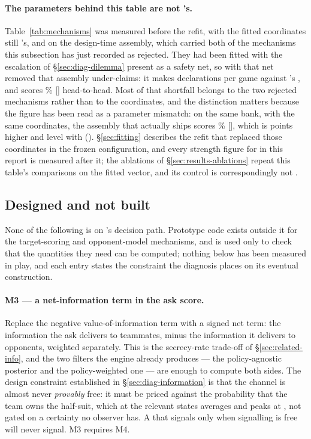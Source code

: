 \paragraph{The parameters behind this table are not \vfive{}'s.}
Table~\ref{tab:mechanisms} was measured before the refit, with the
\numFitDims{} fitted coordinates still \vfour{}'s, and on the design-time
assembly, which carried both of the mechanisms this subsection has just recorded
as rejected. They had been fitted with the escalation of
\S\ref{sec:diag-dilemma} present as a safety net, so with that net removed that
assembly under-claims: it makes \numVfourParamDecl{}
declarations per game against \vfour{}'s \numVfourDecl{}, and scores
\numVfourParamWin\% [\numVfourParamCI] head-to-head. Most of that shortfall
belongs to the two rejected mechanisms rather than to the coordinates, and the
distinction matters because the figure has been read as a parameter mismatch:
on the same bank, with the same \vfour{} coordinates, the assembly that actually
ships scores \numShipParamSameBank\% [\numShipParamSameCI], which is
\numRejectedCost{} points higher and level with \vfour{}
().
\S\ref{sec:fitting} describes the refit that replaced those
coordinates in the frozen configuration, and every strength figure for \vfive{}
in this report is measured after it; the ablations of
\S\ref{sec:results-ablations} repeat this table's comparisons on the fitted
vector, and its control is correspondingly not \vfour{}.

\subsection{Designed and not built}
\label{sec:mech-designed}

None of the following is on \vfive{}'s decision path. Prototype code exists
outside it for the target-scoring and opponent-model mechanisms, and is used only
to check that the quantities they need can be computed; nothing below has been
measured in play, and each entry states the constraint the diagnosis places on
its eventual construction.

\paragraph{M3 --- a net-information term in the ask score.} Replace the negative
value-of-information term with a signed net term: the information the ask
delivers to teammates, minus the information it delivers to opponents, weighted
separately. This is the secrecy-rate trade-off of \S\ref{sec:related-info}, and
the two filters the engine already produces --- the policy-agnostic posterior and
the policy-weighted one --- are enough to compute both sides. The design
constraint established in \S\ref{sec:diag-information} is that the channel is
almost never \emph{provably} free: it must be priced against the probability that
the team owns the half-suit, which at the relevant states averages
\numOwnProbMean{} and peaks at \numOwnProbMax{}, not
gated on a certainty no observer has. A \vfive{} that signals only when signalling
is free will never signal. M3 requires M4.

